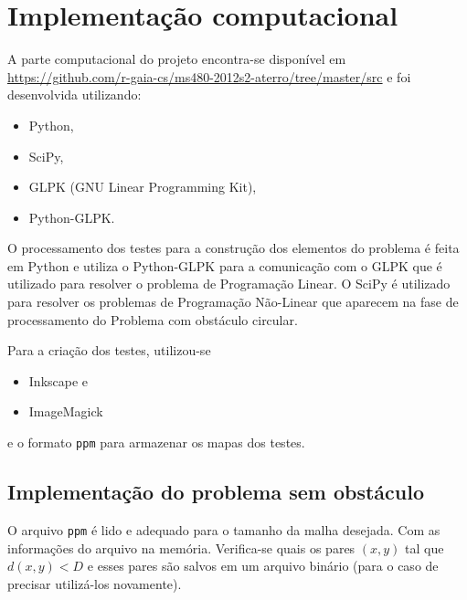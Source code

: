 %
%
%

\section{Implementa\c{c}\~{a}o computacional}
A parte computacional do projeto encontra-se disponível em
\url{https://github.com/r-gaia-cs/ms480-2012s2-aterro/tree/master/src} e foi
desenvolvida utilizando:
\begin{itemize}
    \item Python\nocite{Python},
    \item SciPy\nocite{SciPy},
    \item GLPK (GNU Linear Programming Kit)\nocite{GLPK},
    \item Python-GLPK.
\end{itemize}
O processamento dos testes para a construção dos elementos do problema é feita
em Python e utiliza o Python-GLPK para a comunicação com o GLPK que é utilizado
para resolver o problema de Programação Linear. O SciPy é utilizado para
resolver os problemas de Programação Não-Linear que aparecem na fase de
processamento do Problema com obstáculo circular.

Para a criação dos testes, utilizou-se
\begin{itemize}
    \item Inkscape e
    \item ImageMagick
\end{itemize}
e o formato \texttt{ppm} para armazenar os mapas dos testes.

\subsection{Implementação do problema sem obstáculo}
O arquivo \texttt{ppm} é lido e adequado para o tamanho da malha
desejada. Com as informações do arquivo na memória. Verifica-se quais os pares
$(x, y)$ tal que $d(x, y) < D$ e esses pares são salvos em um
arquivo binário (para o caso de precisar utilizá-los novamente).

